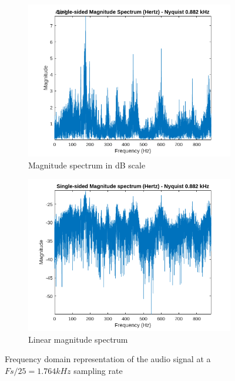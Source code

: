 \documentclass[12pt]{article}
\newcommand{\code}[1]{\colorbox{gray!20}{\texttt{#1}}}
\begin{document}
\begin{figure}[htbp]
  \centering
  \begin{subfigure}[b]{0.48\textwidth} %
    \includegraphics[width=\linewidth]{labs/lab1/lab-report-tex/figures/figure_11.png}
    \caption{Magnitude spectrum in dB scale}
    \label{fig:f2}
  \end{subfigure}
  \begin{subfigure}[b]{0.48\textwidth} %
    \includegraphics[width=\linewidth]{labs/lab1/lab-report-tex/figures/figure_12.png}
    \caption{Linear magnitude spectrum}
    \label{fig:f2}
  \end{subfigure}
  \caption{Frequency domain representation of the audio signal at a \code{$Fs/25 = 1.764kHz$} sampling rate}
\end{figure}
\end{document}
